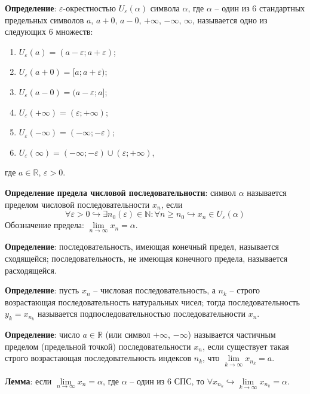 \documentclass[12pt, a4paper, reqno]{article}
\begin{document}
    \textbf{Определение}: $\varepsilon$-окрестностью $U_{\varepsilon}(\alpha)$ символа $\alpha$, где
    $\alpha$ -- один из 6 стандартных предельных символов $a$, $a + 0$, $a - 0$, $+\infty$, $-\infty$,
    $\infty$, называется одно из следующих 6 множеств:
    \begin{enumerate}
        \item $U_{\varepsilon}(a) = (a - \varepsilon; a + \varepsilon)$;
        \item $U_{\varepsilon}(a + 0) = [a; a + \varepsilon)$;
        \item $U_{\varepsilon}(a - 0) = (a - \varepsilon; a]$;
        \item $U_{\varepsilon}(+\infty) = (\varepsilon; +\infty)$;
        \item $U_{\varepsilon}(-\infty) = (-\infty; -\varepsilon)$;
        \item $U_{\varepsilon}(\infty) = (-\infty; -\varepsilon)\cup(\varepsilon; +\infty)$,
    \end{enumerate}
    где $a\in\mathbb{R}$, $\varepsilon > 0$.

    \textbf{Определение предела числовой последовательности}: символ $\alpha$ называется пределом
    числовой последовательности $x_n$, если
    \begin{equation*}
    \forall \varepsilon > 0 \hookrightarrow \exists n_0(\varepsilon)\in\mathbb{N}:
    \forall n \geq n_0 \hookrightarrow x_n\in U_{\varepsilon}(\alpha)
    \end{equation*}
    Обозначение предела: $\lim\limits_{n\to\infty} x_n = \alpha$.

    \textbf{Определение}: последовательность, имеющая конечный предел, называется сходящейся;
    последовательность, не имеющая конечного предела, называется расходящейся.

    \textbf{Определение}: пусть $x_n$ -- числовая последовательность, а $n_k$ -- строго возрастающая
    последовательность натуральных чисел; тогда последовательность $y_k = x_{n_k}$ называется
    подпоследовательностью последовательности $x_n$.

    \textbf{Определение}: число $a\in\mathbb{R}$ (или символ $+\infty$, $-\infty$) называется
    частичным пределом (предельной точкой) последовательности $x_n$, если существует такая строго
    возрастающая последовательность индексов $n_k$, что $\lim\limits_{k\to\infty} x_{n_k} = a$.

    \textbf{Лемма}: если $\lim\limits_{n\to\infty} x_n = \alpha$, где $\alpha$ -- один из 6 СПС, то
    $\forall x_{n_k} \hookrightarrow \lim\limits_{k\to\infty} x_{n_k} = \alpha$.
\end{document}

